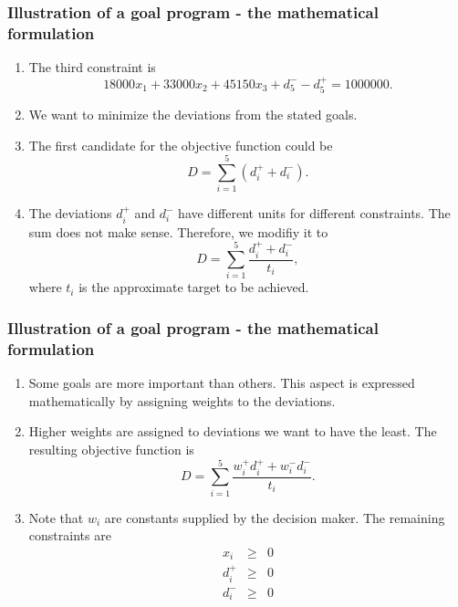 \documentclass{beamer}
\begin{document}
\begin{frame}
\frametitle{Illustration of a goal program - the mathematical formulation}
\begin{enumerate}
\item The third constraint is
\begin{equation}\label{e8}
18000x_1 + 33000 x_2 + 45150x_3 + d_5^- - d_5^+ = 1000000.
\end{equation}
\item We want to minimize the deviations from the stated goals.
\item The first candidate for the objective function could be
\begin{equation}\label{e9}
D = \sum_{i=1}^5 (d_i^+ + d_i^-).
\end{equation}
\item The deviations $d_i^+$ and $d_i^-$ have different units for different 
constraints. The sum does not make sense. Therefore, we modifiy it to
\begin{equation}\label{e10}
D = \sum_{i=1}^5 \frac{d_i^+ + d_i^-}{t_i},
\end{equation}
where $t_i$ is the approximate target to be achieved.
\end{enumerate}
\end{frame}

\begin{frame}
\frametitle{Illustration of a goal program - the mathematical formulation}
\begin{enumerate}
\item Some goals are more important than others. This aspect is expressed 
mathematically by assigning weights to the deviations.
\item Higher weights are assigned to deviations we want to have the least. The
resulting objective function is
\begin{equation}\label{e11}
D = \sum_{i=1}^5 \frac{w_i^+d_i^+ + w_i^-d_i^-}{t_i}.
\end{equation}
\item Note that $w_i$ are constants supplied by the decision maker. The 
remaining constraints are
\begin{eqnarray}
x_i &\ge& 0 \label{e12} \\
d_i^+ &\ge& 0 \label{e13} \\
d_i^- &\ge& 0 \label{e14}
\end{eqnarray}
\end{enumerate}
\end{frame}
\end{document}
